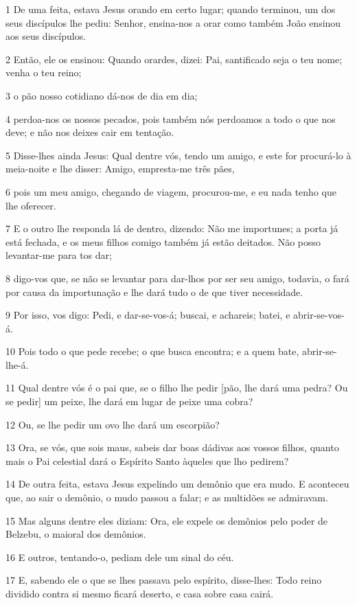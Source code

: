\par 1 De uma feita, estava Jesus orando em certo lugar; quando terminou, um dos seus discípulos lhe pediu: Senhor, ensina-nos a orar como também João ensinou aos seus discípulos.
\par 2 Então, ele os ensinou: Quando orardes, dizei: Pai, santificado seja o teu nome; venha o teu reino;
\par 3 o pão nosso cotidiano dá-nos de dia em dia;
\par 4 perdoa-nos os nossos pecados, pois também nós perdoamos a todo o que nos deve; e não nos deixes cair em tentação.
\par 5 Disse-lhes ainda Jesus: Qual dentre vós, tendo um amigo, e este for procurá-lo à meia-noite e lhe disser: Amigo, empresta-me três pães,
\par 6 pois um meu amigo, chegando de viagem, procurou-me, e eu nada tenho que lhe oferecer.
\par 7 E o outro lhe responda lá de dentro, dizendo: Não me importunes; a porta já está fechada, e os meus filhos comigo também já estão deitados. Não posso levantar-me para tos dar;
\par 8 digo-vos que, se não se levantar para dar-lhos por ser seu amigo, todavia, o fará por causa da importunação e lhe dará tudo o de que tiver necessidade.
\par 9 Por isso, vos digo: Pedi, e dar-se-vos-á; buscai, e achareis; batei, e abrir-se-vos-á.
\par 10 Pois todo o que pede recebe; o que busca encontra; e a quem bate, abrir-se-lhe-á.
\par 11 Qual dentre vós é o pai que, se o filho lhe pedir [pão, lhe dará uma pedra? Ou se pedir] um peixe, lhe dará em lugar de peixe uma cobra?
\par 12 Ou, se lhe pedir um ovo lhe dará um escorpião?
\par 13 Ora, se vós, que sois maus, sabeis dar boas dádivas aos vossos filhos, quanto mais o Pai celestial dará o Espírito Santo àqueles que lho pedirem?
\par 14 De outra feita, estava Jesus expelindo um demônio que era mudo. E aconteceu que, ao sair o demônio, o mudo passou a falar; e as multidões se admiravam.
\par 15 Mas alguns dentre eles diziam: Ora, ele expele os demônios pelo poder de Belzebu, o maioral dos demônios.
\par 16 E outros, tentando-o, pediam dele um sinal do céu.
\par 17 E, sabendo ele o que se lhes passava pelo espírito, disse-lhes: Todo reino dividido contra si mesmo ficará deserto, e casa sobre casa cairá.
